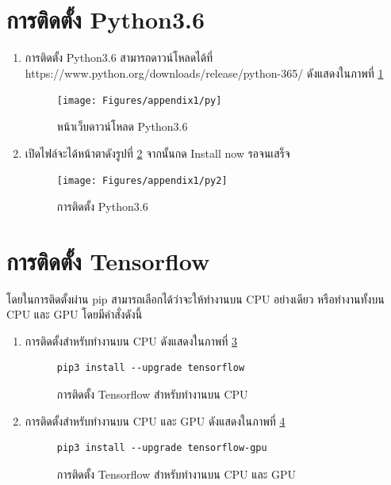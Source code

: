 \section{การติดตั้ง Python3.6}
	\begin{enumerate}
		\item การติดตั้ง Python3.6 สามารถดาวน์โหลดได้ที่ https://www.python.org/downloads/release/python-365/ ดังแสดงในภาพที่ \ref{Fig:py}
			\begin{figure}[H]
				\texttt{[image: Figures/appendix1/py]}
				\caption{หน้าเว็บดาวน์โหลด Python3.6}
				\label{Fig:py}
			\end{figure}
		\item เปิดไฟล์จะได้หน้าตาดังรูปที่ \ref{Fig:py2} จากนั้นกด Install now รอจนเสร็จ
			\begin{figure}[H]
				\texttt{[image: Figures/appendix1/py2]}
				\caption{การติดตั้ง Python3.6}
				\label{Fig:py2}
			\end{figure}
	\end{enumerate}
	
\newpage
\section{การติดตั้ง Tensorflow}
	โดยในการติดตั้งผ่าน pip สามารถเลือกได้ว่าจะให้ทำงานบน CPU อย่างเดียว หรือทำงานทั้งบน CPU และ GPU โดยมีคำสั่งดังนี้
	\begin{enumerate}
    	\item การติดตั้งสำหรับทำงานบน CPU  ดังแสดงในภาพที่ \ref{Fig:tensorCPU}
			\begin{figure}[H]
				{\begin{lstlisting}
pip3 install --upgrade tensorflow
				\end{lstlisting}}
				\caption{การติดตั้ง Tensorflow สำหรับทำงานบน CPU}
				\label{Fig:tensorCPU}
			\end{figure}

   		\item การติดตั้งสำหรับทำงานบน CPU และ GPU ดังแสดงในภาพที่ \ref{Fig:tensorGPU}
			\begin{figure}[H]
				{\begin{lstlisting}
pip3 install --upgrade tensorflow-gpu
				\end{lstlisting}}
				\caption{การติดตั้ง Tensorflow สำหรับทำงานบน CPU และ GPU}
				\label{Fig:tensorGPU}
			\end{figure}
	\end{enumerate}

